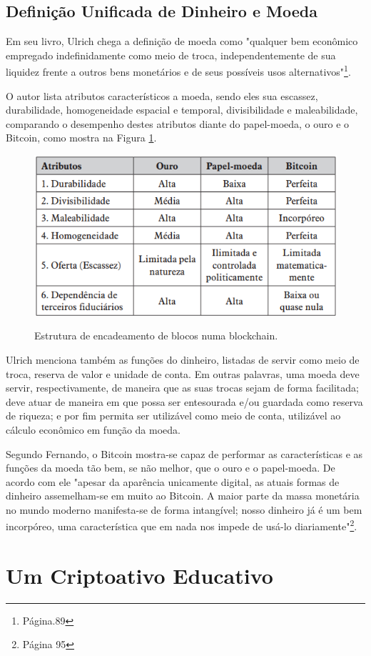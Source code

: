 \subsection*{Definição Unificada de Dinheiro e Moeda}
Em seu livro, Ulrich chega a definição de moeda como "qualquer bem econômico empregado indefinidamente como meio de troca, independentemente de sua liquidez frente a outros bens monetários e de seus possíveis usos alternativos"\footnote{Página.89}.

O autor lista atributos característicos a moeda, sendo eles sua escassez,
durabilidade, homogeneidade espacial e temporal, divisibilidade e maleabilidade, comparando o desempenho destes atributos diante do papel-moeda, o ouro e o Bitcoin, como mostra na Figura \ref*{fig:atributos}.

\begin{figure} [h]
    \centering
        \caption{Estrutura de encadeamento de blocos numa blockchain.}
        \includegraphics[width=.8\linewidth]{images/atributos.png}
        \label{fig:atributos}
\end{figure}

Ulrich menciona também as funções do dinheiro, listadas de servir como meio de troca, reserva de valor e unidade de conta. Em outras palavras, uma moeda deve servir, respectivamente, de maneira que as suas trocas sejam de forma facilitada; deve atuar de maneira em que possa ser entesourada e/ou guardada como reserva de riqueza; e por fim permita ser utilizável como meio de conta, utilizável ao cálculo econômico em função da moeda.

Segundo Fernando, o Bitcoin mostra-se capaz de performar as características e as funções da moeda tão bem, se não melhor, que o ouro e o papel-moeda. De acordo com ele "apesar da aparência unicamente digital, as atuais formas de dinheiro assemelham-se em muito ao Bitcoin. A maior parte da massa monetária no mundo moderno manifesta-se de forma intangível; nosso dinheiro já é um bem incorpóreo, uma característica que em nada nos impede de usá-lo diariamente"\footnote{Página 95}.

\section{Um Criptoativo Educativo} \label{sec:criptoeducativo}


